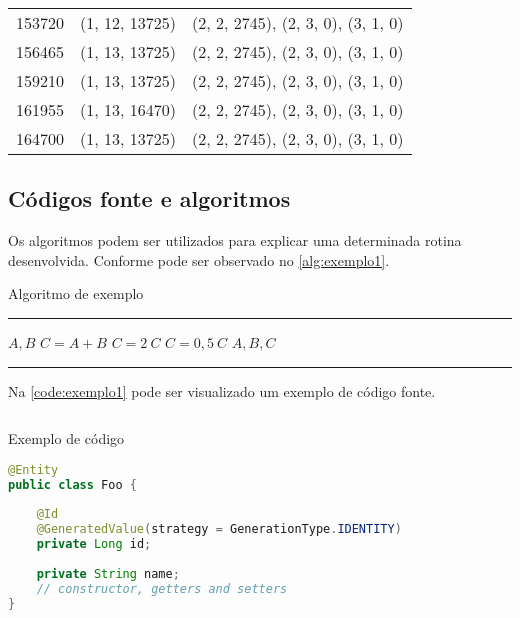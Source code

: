\begin{longtable}{@{\extracolsep{\fill}}lll}
153720 & (1, 12, 13725) & (2, 2, 2745), (2, 3, 0), (3, 1, 0)                  \\
156465 & (1, 13, 13725) & (2, 2, 2745), (2, 3, 0), (3, 1, 0)                  \\
159210 & (1, 13, 13725) & (2, 2, 2745), (2, 3, 0), (3, 1, 0)                  \\
161955 & (1, 13, 16470) & (2, 2, 2745), (2, 3, 0), (3, 1, 0)                  \\
164700 & (1, 13, 13725) & (2, 2, 2745), (2, 3, 0), (3, 1, 0)                  \\
\end{longtable}


\subsection{Códigos fonte e algoritmos}\label{subsec:algoritimos}

Os algoritmos podem ser utilizados para explicar uma determinada rotina desenvolvida. Conforme pode ser observado no \autoref{alg:exemplo1}.

\begin{algorithm}[htb]%
\caption{Algoritmo de exemplo}%
\label{alg:exemplo1}%
\hrule
\begin{algorithmic}[1]%
\ENSURE $A, B$
\STATE $C = A + B$
\STATE $C = 2 \ C$
\ELSE
\STATE $C = 0,5 \ C$
\ENDIF
\PRINT $A, B, C$
\end{algorithmic}
\hrule
\fonte{}%
\end{algorithm}

\lipsum[1]

\lipsum[1]

Na \autoref{code:exemplo1} pode ser visualizado um exemplo de código fonte.

\begin{sourcecode}[htb]
\caption{\label{code:exemplo1}Exemplo de código}
\begin{lstlisting}[frame=single, language=Java]
@Entity
public class Foo {
 
    @Id
    @GeneratedValue(strategy = GenerationType.IDENTITY)
    private Long id;
 
    private String name;
    // constructor, getters and setters
}
\end{lstlisting}
\fonte{}
\end{sourcecode}

